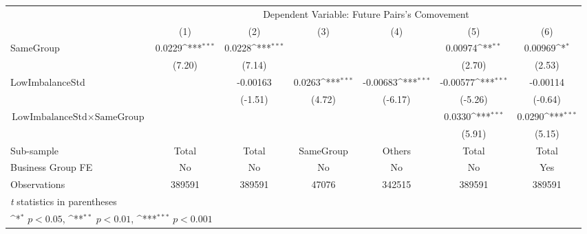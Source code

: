 {
\def\sym#1{\ifmmode^{#1}\else\(^{#1}\)\fi}
\begin{tabular}{l*{6}{c}}
\hline\hline
                    &\multicolumn{6}{c}{Dependent Variable:  Future Pairs's Comovement}                                                                 \\\cmidrule(lr){2-7}
                    &\multicolumn{1}{c}{(1)}         &\multicolumn{1}{c}{(2)}         &\multicolumn{1}{c}{(3)}         &\multicolumn{1}{c}{(4)}         &\multicolumn{1}{c}{(5)}         &\multicolumn{1}{c}{(6)}         \\
\hline
SameGroup           &      0.0229\sym{***}&      0.0228\sym{***}&                     &                     &     0.00974\sym{**} &     0.00969\sym{*}  \\
                    &      (7.20)         &      (7.14)         &                     &                     &      (2.70)         &      (2.53)         \\
[1em]
LowImbalanceStd     &                     &    -0.00163         &      0.0263\sym{***}&    -0.00683\sym{***}&    -0.00577\sym{***}&    -0.00114         \\
                    &                     &     (-1.51)         &      (4.72)         &     (-6.17)         &     (-5.26)         &     (-0.64)         \\
[1em]
 $ \text{LowImbalanceStd} \times {\text{SameGroup} } $ &                     &                     &                     &                     &      0.0330\sym{***}&      0.0290\sym{***}\\
                    &                     &                     &                     &                     &      (5.91)         &      (5.15)         \\
\hline
Sub-sample          &       Total         &       Total         &   SameGroup         &      Others         &       Total         &       Total         \\
Business Group FE   &          No         &          No         &          No         &          No         &          No         &         Yes         \\
Observations        &      389591         &      389591         &       47076         &      342515         &      389591         &      389591         \\
\hline\hline
\multicolumn{7}{l}{\footnotesize \textit{t} statistics in parentheses}\\
\multicolumn{7}{l}{\footnotesize \sym{*} \(p<0.05\), \sym{**} \(p<0.01\), \sym{***} \(p<0.001\)}\\
\end{tabular}
}

